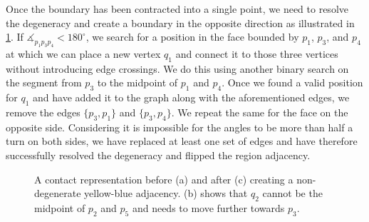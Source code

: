 Once the boundary has been contracted into a single point, we need to resolve the degeneracy and create a boundary in the opposite direction as illustrated in \cref{fig:flip-internal-edge-expand}. If $\measuredangle_{p_1p_3p_4} < 180^\circ$, we search for a position in the face bounded by $p_1$, $p_3$, and $p_4$ at which we can place a new vertex $q_1$ and connect it to those three vertices without introducing edge crossings. We do this using another binary search on the segment from $p_3$ to the midpoint of $p_1$ and $p_4$. Once we found a valid position for $q_1$ and have added it to the graph along with the aforementioned edges, we remove the edges $\{p_3,p_1\}$ and $\{p_3,p_4\}$. We repeat the same for the face on the opposite side. Considering it is impossible for the angles to be more than half a turn on both sides, we have replaced at least one set of edges and have therefore successfully resolved the degeneracy and flipped the region adjacency.

\begin{figure}[H]
	\centering
	\quad
	\quad
	\caption{A contact representation before (a) and after (c) creating a non-degenerate yellow-blue adjacency. (b) shows that $q_2$ cannot be the midpoint of $p_2$ and $p_5$ and needs to move further towards $p_3$.}
	\label{fig:flip-internal-edge-expand}
\end{figure}
